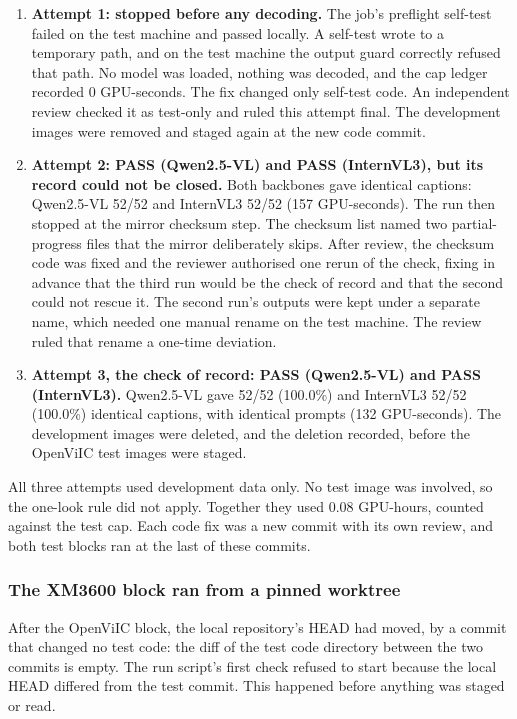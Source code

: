 \documentclass[manuscript,screen]{acmart}
\providecommand{\tightlist}{\setlength{\itemsep}{0pt}\setlength{\parskip}{0pt}}
\begin{document}
\begin{enumerate}
\def\labelenumi{\arabic{enumi}.}
\tightlist
\item
  \textbf{Attempt 1: stopped before any decoding.} The job's preflight self-test failed on the test
  machine and passed locally. A self-test wrote to a temporary path, and on the test machine the
  output guard correctly refused that path. No model was loaded, nothing was decoded, and the cap
  ledger recorded 0 GPU-seconds. The fix changed only self-test code. An independent review checked
  it as test-only and ruled this attempt final. The development images were removed and staged again
  at the new code commit.
\item
  \textbf{Attempt 2: PASS (Qwen2.5-VL) and PASS (InternVL3), but its record could not be closed.}
  Both backbones gave identical captions: Qwen2.5-VL 52/52 and InternVL3 52/52 (157 GPU-seconds).
  The run then stopped at the mirror checksum step. The checksum list named two partial-progress
  files that the mirror deliberately skips. After review, the checksum code was fixed and the
  reviewer authorised one rerun of the check, fixing in advance that the third run would be the
  check of record and that the second could not rescue it. The second run's outputs were kept under
  a separate name, which needed one manual rename on the test machine. The review ruled that rename
  a one-time deviation.
\item
  \textbf{Attempt 3, the check of record: PASS (Qwen2.5-VL) and PASS (InternVL3).} Qwen2.5-VL gave
  52/52 (100.0\%) and InternVL3 52/52 (100.0\%) identical captions, with identical prompts (132
  GPU-seconds). The development images were deleted, and the deletion recorded, before the OpenViIC
  test images were staged.
\end{enumerate}

All three attempts used development data only. No test image was involved, so the one-look rule did
not apply. Together they used 0.08 GPU-hours, counted against the test cap. Each code fix was a new
commit with its own review, and both test blocks ran at the last of these commits.

\subsubsection{The XM3600 block ran from a pinned
worktree}\label{the-xm3600-block-ran-from-a-pinned-worktree}

After the OpenViIC block, the local repository's HEAD had moved, by a commit that changed no test
code: the diff of the test code directory between the two commits is empty. The run script's first
check refused to start because the local HEAD differed from the test commit. This happened before
anything was staged or read.
\end{document}
